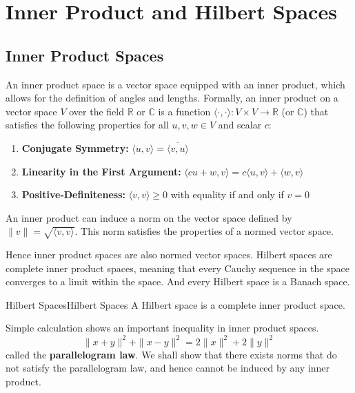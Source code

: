 \documentclass[../main.tex]{subfiles}
\begin{document}
\chapter{Inner Product and Hilbert Spaces}
\section{Inner Product Spaces}

An inner product space is a vector space equipped with an inner product, which allows for the definition of angles and lengths. Formally, an inner product on a vector space $V$ over the field $\mathbb{R}$ or $\mathbb{C}$ is a function $\langle \cdot, \cdot \rangle : V \times V \to \mathbb{R}$ (or $\mathbb{C}$) that satisfies the following properties for all $u, v, w \in V$ and scalar $c$:
\begin{enumerate}
    \item \textbf{Conjugate Symmetry:} $\langle u, v \rangle = \overline{\langle v, u \rangle}$
    \item \textbf{Linearity in the First Argument:} $\langle cu + w, v \rangle = c\langle u, v \rangle + \langle w, v \rangle$
    \item \textbf{Positive-Definiteness:} $\langle v, v \rangle \geq 0$ with equality if and only if $v = 0$
\end{enumerate}

An inner product can induce a norm on the vector space defined by $\|v\| = \sqrt{\langle v, v \rangle}$. This norm satisfies the properties of a normed vector space.

Hence inner product spaces are also normed vector spaces. Hilbert spaces are complete inner product spaces, meaning that every Cauchy sequence in the space converges to a limit within the space. And every Hilbert space is a Banach space.

\begin{definition}{Hilbert Spaces}{Hilbert Spaces}
	A Hilbert space is a complete inner product space.
\end{definition}

Simple calculation shows an important inequality in inner product spaces.
\begin{equation}
	\|x+y\|^2 + \|x-y\|^2 = 2\|x\|^2 + 2\|y\|^2
\end{equation}
called the \textbf{parallelogram law}. We shall show that there exists norms that do not satisfy the parallelogram law, and hence cannot be induced by any inner product.
\end{document}
